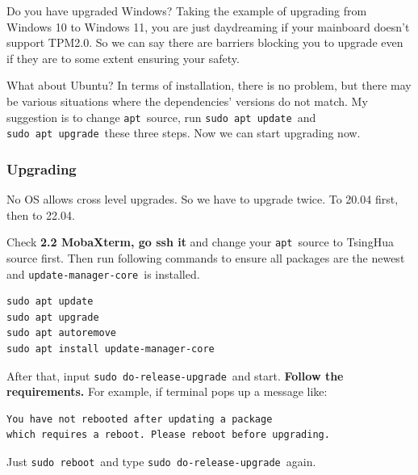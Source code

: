 \documentclass[12pt]{ctexart}
\begin{document}
Do you have upgraded Windows? Taking the example of upgrading from
Windows 10 to Windows 11, you are just daydreaming if your mainboard
doesn't support TPM2.0. So we can say there are barriers
blocking you to upgrade even if they are to some extent ensuring your
safety.

What about Ubuntu? In terms of installation, there is no problem, but
there may be various situations where the dependencies'
versions do not match. My suggestion is to change \texttt{apt}\ source,
run \texttt{sudo\ apt\ update}\ and \texttt{sudo\ apt\ upgrade}\ these
three steps. Now we can start upgrading now.

\subsubsection{\textbf{Upgrading}}

No OS allows cross level upgrades. So we have to upgrade twice. To 20.04
first, then to 22.04.

Check \textbf{2.2 MobaXterm, go ssh it} and change your \texttt{apt}\
source to TsingHua source first. Then run following commands to ensure
all packages are the newest and \texttt{update-manager-core}\ is
installed.

\begin{adjustwidth}{2em}{0pt}
\begin{verbatim}
sudo apt update
sudo apt upgrade
sudo apt autoremove
sudo apt install update-manager-core
\end{verbatim}
\end{adjustwidth}

After that, input \texttt{sudo\ do-release-upgrade}\ and start.
\textbf{Follow the requirements.} For example, if terminal pops up a
message like:

\begin{adjustwidth}{2em}{0pt}
\begin{verbatim}
You have not rebooted after updating a package 
which requires a reboot. Please reboot before upgrading.
\end{verbatim}
\end{adjustwidth}

Just \texttt{sudo\ reboot}\ and type \texttt{sudo\ do-release-upgrade}\
again.
\end{document}
